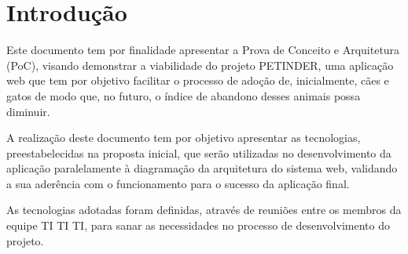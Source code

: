 \chapter[Introdução]{Introdução}
Este documento tem por finalidade apresentar a Prova de Conceito e Arquitetura (PoC), visando demonstrar a viabilidade do projeto PETINDER, uma aplicação web que tem por objetivo facilitar o processo de adoção de, inicialmente, cães e gatos de modo que, no futuro, o índice de abandono desses animais possa diminuir. 

A realização deste documento tem por objetivo apresentar as tecnologias, preestabelecidas na proposta inicial, que serão utilizadas no desenvolvimento da aplicação paralelamente à diagramação da arquitetura do sistema web, validando a sua aderência com o funcionamento para o sucesso da aplicação final. 

As tecnologias adotadas foram definidas, através de reuniões entre os membros da equipe TI TI TI, para sanar as necessidades no processo de desenvolvimento do projeto. 

